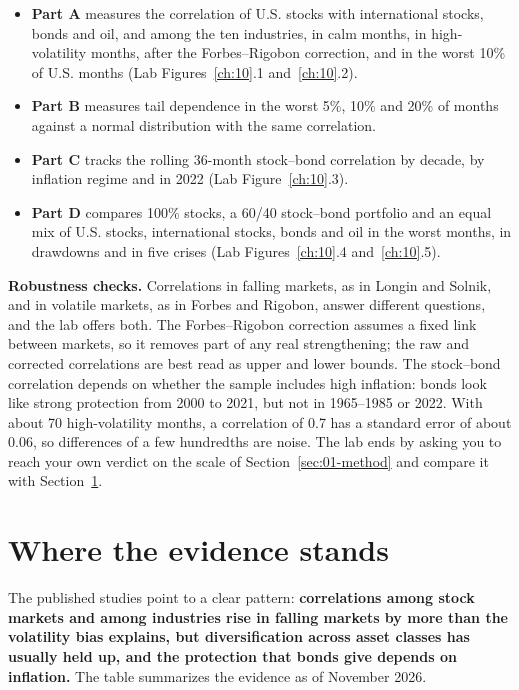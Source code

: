\begin{itemize}
  \item \textbf{Part A} measures the correlation of U.S. stocks with international stocks, bonds and oil, and among the ten industries, in calm months, in high-volatility months, after the Forbes--Rigobon correction, and in the worst 10\% of U.S. months (Lab Figures~\ref{ch:10}.1 and~\ref{ch:10}.2).
  \item \textbf{Part B} measures tail dependence in the worst 5\%, 10\% and 20\% of months against a normal distribution with the same correlation.
  \item \textbf{Part C} tracks the rolling 36-month stock--bond correlation by decade, by inflation regime and in 2022 (Lab Figure~\ref{ch:10}.3).
  \item \textbf{Part D} compares 100\% stocks, a 60/40 stock--bond portfolio and an equal mix of U.S. stocks, international stocks, bonds and oil in the worst months, in drawdowns and in five crises (Lab Figures~\ref{ch:10}.4 and~\ref{ch:10}.5).
\end{itemize}

\label{sec:13-stress}
\textbf{Robustness checks.} Correlations in falling markets, as in Longin and Solnik, and in volatile markets, as in Forbes and Rigobon, answer different questions, and the lab offers both. The Forbes--Rigobon correction assumes a fixed link between markets, so it removes part of any real strengthening; the raw and corrected correlations are best read as upper and lower bounds. The stock--bond correlation depends on whether the sample includes high inflation: bonds look like strong protection from 2000 to 2021, but not in 1965--1985 or 2022. With about 70 high-volatility months, a correlation of 0.7 has a standard error of about 0.06, so differences of a few hundredths are noise. The lab ends by asking you to reach your own verdict on the scale of Section~\ref{sec:01-method} and compare it with Section~\ref{sec:13-verdict}.

\section{Where the evidence stands}
\label{sec:13-verdict}

The published studies point to a clear pattern: \textbf{correlations among stock markets and among industries rise in falling markets by more than the volatility bias explains, but diversification across asset classes has usually held up, and the protection that bonds give depends on inflation.} The table summarizes the evidence as of November 2026.

